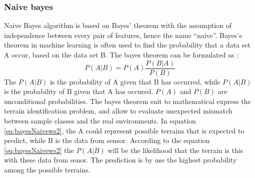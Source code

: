 \documentclass[USenglish]{ifimaster}  %
\begin{document}
	
	
	\subsubsection{Naive bayes}
	Naive Bayes algorithm is based on Bayes’ theorem with the assumption of independence between every pair of features, hence the name “naive”. Bayes's theorem in machine learning is often used to find the probability that a data set A occur, based on the data set B. The bayes theorem can be formulated as \cite{Press:2007:NRE:1403886}:
	\begin{equation}
	P(A \vert B) = P(A)\frac{P(B \vert A)}{P(B)}
	\label{eq:bayesNaivews2}
	\end{equation}
	The $P(A \vert B)$ is the probability of A given that B has occurred, while $P(A \vert B)$ is the probability of B given that A has occured. $P(A)$ and $P(B)$ are unconditional probabilities. The bayes theorem suit to mathematical express the terrain identification problem, and allow to evaluate unexpected mismatch between sample classes and the real environments. In equation \ref{eq:bayesNaivews2}, the A could represent possible terrains that is expected to predict, while B is the data from sensor. According to the equation \ref{eq:bayesNaivews2} the $P(A \vert B)$ will be the likelihood that the terrain is this with these data from senor. The prediction is by use the highest probability among the possible terrains. 
	
\end{document}
